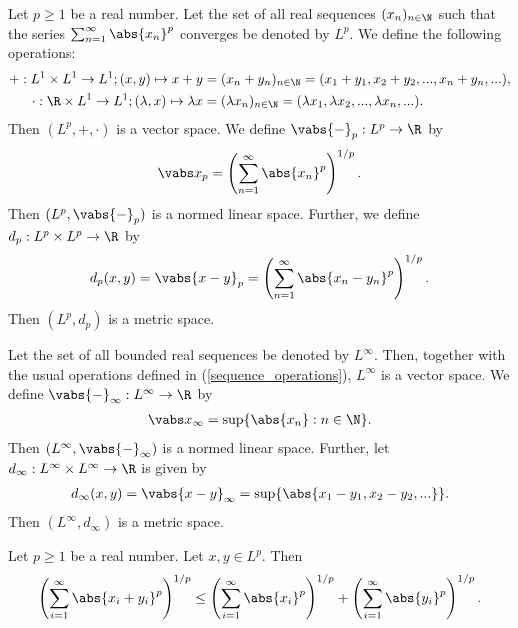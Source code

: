 \documentclass{article}
\begin{document}
\begin{lemma}
	Let $p\geq 1$ be a real number.
	Let the set of all real sequences $(x_n)_{n\in\N}$ such that the series
	$\sum_{n=1}^\infty \abs{x_n}^p$ converges be denoted by $L^p$.
	We define the following operations:
	\begin{align}
		\label{sequence_operations}
		+:L^1\times L^1\to L^1;(x,y)\mapsto x+y               & =(x_n+y_n)_{n\in\N}=(x_1+y_1,x_2+y_2,...,x_n+y_n,...),                 \\
		\cdot:\R\times L^1\to L^1;(\lambda,x)\mapsto\lambda x & =(\lambda x_n)_{n\in\N}=(\lambda x_1,\lambda x_2,...,\lambda x_n,...).
	\end{align}
	Then $(L^p,+,\cdot)$ is a vector space.
	We define $\vabs{-}_p:L^p\to\R$ by
	\begin{align*}
		\vabs x_p = \left(\sum_{n=1}^\infty \abs{x_n}^p\right)^{1/p}.
	\end{align*}
	Then $(L^p, \vabs{-}_p)$ is a normed linear space.
	Further, we define $d_p:L^p\times L^p\to\R$ by
	\begin{align*}
		d_p(x,y)=\vabs{x-y}_p=\left(\sum_{n=1}^\infty\abs{x_n-y_n}^p\right)^{1/p}.
	\end{align*}
	Then $(L^p,d_p)$ is a metric space.
\end{lemma}

\begin{lemma}
	Let the set of all bounded real sequences be denoted by $L^\infty$. Then, together with
	the usual operations defined in (\ref{sequence_operations}), $L^\infty$ is a vector space.
	We define $\vabs{-}_\infty:L^\infty\to\R$ by
	\begin{align*}
		\vabs x_\infty = \sup\{\abs{x_n}:n\in\N\}.
	\end{align*}
	Then $(L^\infty,\vabs{-}_\infty)$ is a normed linear space.
	Further, let $d_\infty:L^\infty\times L^\infty\to\R$ is given by
	\begin{align*}
		d_\infty(x,y)=\vabs{x-y}_\infty = \sup\{\abs{x_1-y_1,x_2-y_2,...}\}.
	\end{align*}
	Then $(L^\infty, d_\infty)$ is a metric space.
\end{lemma}

\begin{lemma}
	Let $p\geq 1$ be a real number. Let $x,y\in L^p$. Then
	\begin{align*}
		\left(\sum_{i=1}^\infty \abs{x_i+y_i}^p\right)^{1/p}
		\leq \left(\sum_{i=1}^\infty \abs{x_i}^p\right)^{1/p}
		+ \left(\sum_{i=1}^\infty \abs{y_i}^p\right)^{1/p}.
	\end{align*}
\end{lemma}
\end{document}
